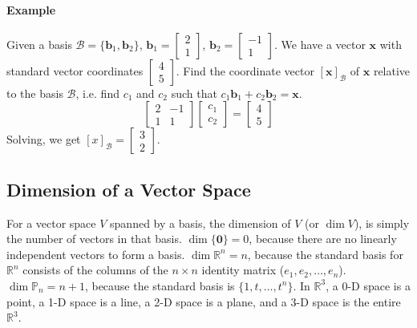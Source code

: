 \documentclass[../linear-algebra.tex]{subfiles}
\begin{document}
\paragraph{Example} Given a basis $\mathcal{B} = \{\mathbf{b}_1, \mathbf{b}_2\}$, $\mathbf{b}_1 = \begin{bmatrix} 2 \\ 1 \end{bmatrix}$, $\mathbf{b}_2 = \begin{bmatrix} -1 \\ 1 \end{bmatrix}$.\newline
We have a vector $\mathbf{x}$ with standard vector coordinates $\begin{bmatrix} 4 \\ 5 \end{bmatrix}$.\newline
Find the coordinate vector $[\mathbf{x}]_{\mathcal{B}}$ of $\mathbf{x}$ relative to the basis $\mathcal{B}$, i.e. find $c_1$ and $c_2$ such that $c_1\mathbf{b}_1 + c_2\mathbf{b}_2 = \mathbf{x}$.
$$\begin{bmatrix} 2 & -1 \\ 1 & 1 \end{bmatrix}\begin{bmatrix} c_1 \\ c_2 \end{bmatrix} = \begin{bmatrix} 4 \\ 5 \end{bmatrix}$$
Solving, we get $[x]_{\mathcal{B}} = \begin{bmatrix} 3 \\ 2 \end{bmatrix}$.

\subsection{Dimension of a Vector Space}
For a vector space $V$ spanned by a basis, the dimension of $V$ (or $\dim V$), is simply the number of vectors in that basis.\newline
$\dim \{\mathbf{0}\} = 0$, because there are no linearly independent vectors to form a basis.\newline
$\dim \mathbb{R}^{n} = n$, because the standard basis for $\mathbb{R}^{n}$ consists of the columns of the $n \times n$ identity matrix ($e_{1}, e_{2}, \dots, e_{n}$).\newline
$\dim \mathbb{P}_{n} = n + 1$, because the standard basis is $\{1, t, \ldots, t^n\}$.\newline
In $\mathbb{R}^3$, a 0-D space is a point, a 1-D space is a line, a 2-D space is a plane, and a 3-D space is the entire $\mathbb{R}^3$.
\end{document}

